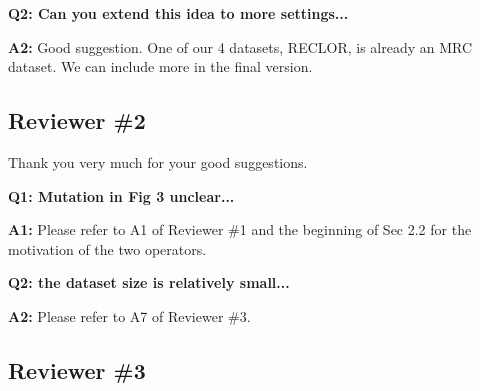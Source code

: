 \documentclass[letterpaper]{article}
\begin{document}


\noindent
\textbf{Q2: Can you extend this idea to more settings...}

\noindent
\textbf{A2:} Good suggestion. One of our 4 datasets, RECLOR, is already 
an MRC dataset. We can include more in the final version. 

\subsection{Reviewer \#2} 

Thank you very much for your good suggestions.

\noindent
\textbf{Q1: Mutation in Fig 3 unclear...} 

\noindent
\textbf{A1:} Please refer to A1 of Reviewer \#1 and the beginning of Sec 2.2 for the motivation of 
the two operators.


\noindent
\textbf{Q2: the dataset size is relatively small...}

\noindent
\textbf{A2:} Please refer to A7 of Reviewer \#3.

\subsection{Reviewer \#3}
\end{document}
